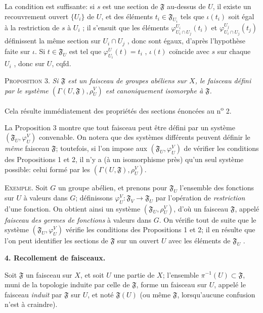 La condition est suffisante: si $s$ est une section de $\mathfrak{F}$ au-dessus de $U$, il existe un recouvrement ouvert $\{U_i\}$ de $U$, et des éléments $t_i \in \mathfrak{F}_{U_i}$ tels que $\iota(t_i)$ soit égal à la restriction de $s$ à $U_i$ ; il s'ensuit que les éléments $\varphi^{U_i}_{U_i \cap U_j}(t_i)$ et $\varphi^{U_j}_{U_i \cap U_j}(t_j)$ définissent la même section sur $U_i \cap U_j$ , donc sont égaux, d'après l'hypothèse faite sur $\iota$. Si $t \in \mathfrak{F}_U$ est tel que $\varphi^{U}_{U_i}(t) = t_i$ , $\iota(t)$ coïncide avec $s$ sur chaque $U_i$ , donc sur $U$, cqfd.

\textsc{Proposition} 3. \textit{Si $\mathfrak{F}$ est un faisceau de groupes abéliens sur $X$, le faisceau défini par le système $(\Gamma(U, \mathfrak{F}), \rho^{V}_{U})$ est canoniquement isomorphe à $\mathfrak{F}$.}

Cela résulte immédiatement des propriétés des sections énoncées au n\textsuperscript{o} 2.

La Proposition 3 montre que tout faisceau peut être défini par un système $(\mathfrak{F}_U , \varphi^{V}_{U})$ convenable. On notera que des systèmes différents peuvent définir le \textit{même} faisceau $\mathfrak{F}$; toutefois, si l'on impose aux $(\mathfrak{F}_U , \varphi^{V}_{U})$ de vérifier les conditions des Propositions 1 et 2, il n'y a (à un isomorphisme près) qu'un seul système possible: celui formé par les $(\Gamma(U, \mathfrak{F}), \rho^{V}_{U})$.

\textsc{Exemple}. Soit $G$ un groupe abélien, et prenons pour $\mathfrak{F}_U$ l'ensemble des fonctions sur $U$ à valeurs dans $G$; définissons $\varphi^{V}_{U} : \mathfrak{F}_V \to \mathfrak{F}_U$ par l'opération de \textit{restriction} d'une fonction. On obtient ainsi un système $(\mathfrak{F}_U , \rho^{V}_{U})$, d'où un faisceau $\mathfrak{F}$, appelé \textit{faisceau des germes de fonctions} à valeurs dans $G$. On vérifie tout de suite que le système $(\mathfrak{F}_U , \varphi^{V}_{U})$ vérifie les conditions des Propositions 1 et 2; il en résulte que l'on peut identifier les sections de $\mathfrak{F}$ sur un ouvert $U$ avec les éléments de $\mathfrak{F}_U$ .


\textbf{4. Recollement de faisceaux.}

Soit $\mathfrak{F}$ un faisceau sur $X$, et soit $U$ une partie de $X$; l'ensemble $\pi^{-1}(U) \subset \mathfrak{F}$, muni de la topologie induite par celle de $\mathfrak{F}$, forme un faisceau sur $U$, appelé le faisceau \textit{induit} par $\mathfrak{F}$ sur $U$, et noté $\mathfrak{F}(U)$ (ou même $\mathfrak{F}$, lorsqu'aucune confusion n'est à craindre).


